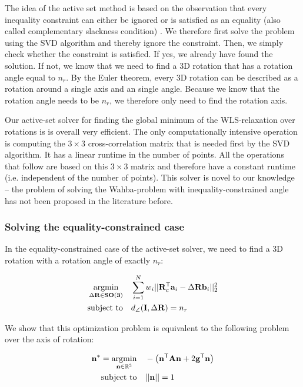 The idea of the active set method is based on the observation that every inequality constraint can either be ignored or is satisfied as an equality (also called complementary slackness condition) \cite[Ch.15 p.424-427]{Numerical-Optimization-Nocedal-Wright}. We therefore first solve the problem using the SVD algorithm and thereby ignore the constraint. Then, we simply check whether the constraint is satisfied. If yes, we already have found the solution. If not, we know that we need to find a 3D rotation that has a rotation angle equal to $n_r$. By the Euler theorem, every 3D rotation can be described as a rotation around a single axis and an single angle. Because we know that the rotation angle needs to be $n_r$, we therefore only need to find the rotation axis.

Our active-set solver for finding the global minimum of the WLS-relaxation over rotations is is overall very efficient. The only computationally intensive operation is computing the $3 \times 3$ cross-correlation matrix that is needed first by the SVD algorithm. It has a linear runtime in the number of points. All the operations that follow are based on this $3 \times 3$ matrix and therefore have a constant runtime (i.e. independent of the number of points).
This solver is novel to our knowledge -- the problem of solving the Wahba-problem with inequality-constrained angle has not been proposed in the literature before.

\subsubsection{Solving the equality-constrained case}
In the equality-constrained case of the active-set solver, we need to find a 3D rotation with a rotation angle of exactly $n_r$:

\begin{equation}
	\label{eq:tls-rwls-eq}
	\begin{aligned}
		\operatorname*{argmin}_{\Delta \mathbf{R} \in \mathbf{SO(3)}}  \quad &\sum_{i=1}^{N} w_i ||\mathbf{R}_c^{\mathsf{T}} \mathbf{a}_i - \Delta\mathbf{R} \mathbf{b}_i ||_2^2 \\
		\text{subject to} \quad &d_{\angle}(\mathbf{I}, \Delta\mathbf{R}) = n_r
	\end{aligned}
\end{equation}

We show that this optimization problem is equivalent to the following problem over the axis of rotation:

\begin{equation}
	\begin{aligned}
		\label{eq:eq-constrained-prob-ev}
		\mathbf{n}^* = \operatorname*{argmin}_{\mathbf{n} \in \mathbb{R}^3} \quad &-\left(\mathbf{n}^{\mathsf{T}} \mathbf{A} \mathbf{n} + 2 \mathbf{g}^{\mathsf{T}} \mathbf{n} \right)\\
		\text{subject to} \quad &|| \mathbf{n}|| = 1\\
	\end{aligned}
\end{equation}

